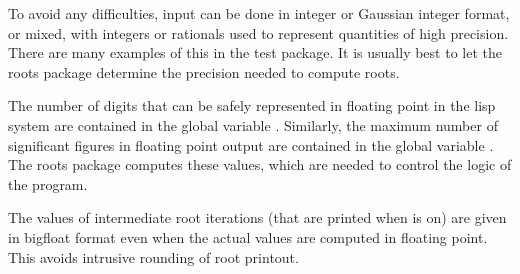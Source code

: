 To avoid any difficulties, input can be done in integer or Gaussian
integer format, or mixed, with integers or rationals used to represent
quantities of high precision. There are many examples of this in the
test package.  It is usually best to let the roots package
determine the precision needed to compute roots.

The number of digits that can be safely represented in floating point in
the lisp system are contained in the global variable .
Similarly, the maximum number of significant figures in floating point
output are contained in the global variable .  The roots
package computes these values, which are needed to control the logic of
the program.  

The values of intermediate root iterations (that are printed when 
is on) are given in bigfloat format even when the actual values
are computed in floating point.  This avoids intrusive rounding of root
printout.
